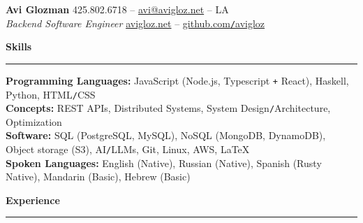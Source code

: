\documentclass[10pt]{article}
\begin{document}
	\pagestyle{empty}
	\begin{center}
		{\huge \textbf{Avi Glozman}} {\large \hfill 425.802.6718 -- \href{mailto:avi@avigloz.net}{avi@avigloz.net} -- LA} \\
		{\large \textsl{Backend Software Engineer} \hfill \href{https://avigloz.net}{avigloz.net} -- \href{https://github.com/avigloz}{github.com\texttt{/}avigloz}}
	\end{center}
	
	\begin{flushleft}	
		\vspace{-0.5mm}
		{\large \raggedright \textbf{Skills}}
		\vspace{1.25mm}
	
		\hrule
	
		\vspace{2.25mm}
    \textbf{Programming Languages:} JavaScript (Node.js, Typescript \texttt{+} React), Haskell, Python, HTML\texttt{/}CSS\\
		\vspace{0.5mm}
		\textbf{Concepts:} REST APIs, Distributed Systems, System Design\texttt{/}Architecture, Optimization\\
		\vspace{0.5mm}
    \textbf{Software:} SQL (PostgreSQL, MySQL), NoSQL (MongoDB, DynamoDB), Object storage (S3), AI\texttt{/}LLMs, Git, Linux, AWS, \LaTeX\\ 
		\vspace{0.5mm}
		\textbf{Spoken Languages:} English (Native), Russian (Native), Spanish (Rusty Native), Mandarin (Basic), Hebrew (Basic) 

		\vspace{1.5mm}
		{\large \raggedright \textbf{Experience}}
		\vspace{1.25mm}
	
		\hrule

		\vspace{2.25mm}


\end{flushleft}
\end{document}
